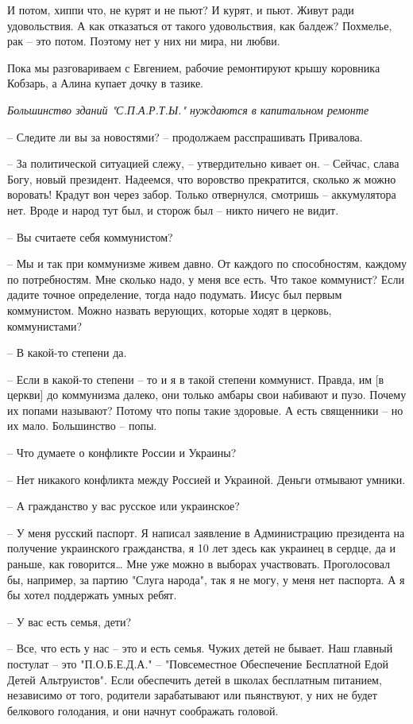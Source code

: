 И потом, хиппи что, не курят и не пьют? И курят, и пьют. Живут ради
удовольствия. А как отказаться от такого удовольствия, как балдеж? Похмелье,
рак – это потом. Поэтому нет у них ни мира, ни любви.

Пока мы разговариваем с Евгением, рабочие ремонтируют крышу коровника Кобзарь,
а Алина купает дочку в тазике.

\emph{Большинство зданий "С.П.А.Р.Т.Ы." нуждаются в капитальном ремонте}

– Следите ли вы за новостями? – продолжаем расспрашивать Привалова.

– За политической ситуацией слежу, – утвердительно кивает он. – Сейчас, слава
Богу, новый президент. Надеемся, что воровство прекратится, сколько ж можно
воровать! Крадут вон через забор. Только отвернулся, смотришь – аккумулятора
нет. Вроде и народ тут был, и сторож был – никто ничего не видит.

– Вы считаете себя коммунистом?

– Мы и так при коммунизме живем давно. От каждого по способностям, каждому по
потребностям. Мне сколько надо, у меня все есть. Что такое коммунист? Если
дадите точное определение, тогда надо подумать. Иисус был первым коммунистом.
Можно назвать верующих, которые ходят в церковь, коммунистами?

– В какой-то степени да.

– Если в какой-то степени – то и я в такой степени коммунист. Правда, им [в
церкви] до коммунизма далеко, они только амбары свои набивают и пузо. Почему их
попами называют? Потому что попы такие здоровые. А есть священники – но их
мало. Большинство – попы.

– Что думаете о конфликте России и Украины?

– Нет никакого конфликта между Россией и Украиной. Деньги отмывают умники.

– А гражданство у вас русское или украинское?

– У меня русский паспорт. Я написал заявление в Администрацию президента на
получение украинского гражданства, я 10 лет здесь как украинец в сердце, да и
раньше, как говорится… Мне уже можно в выборах участвовать. Проголосовал бы,
например, за партию "Слуга народа", так я не могу, у меня нет паспорта. А я бы
хотел поддержать умных ребят. 

– У вас есть семья, дети?

– Все, что есть у нас – это и есть семья. Чужих детей не бывает. Наш главный
постулат – это "П.О.Б.Е.Д.А." – "Повсеместное Обеспечение Бесплатной Едой Детей
Альтруистов". Если обеспечить детей в школах бесплатным питанием, независимо от
того, родители зарабатывают или пьянствуют, у них не будет белкового голодания,
и они начнут соображать головой. 

